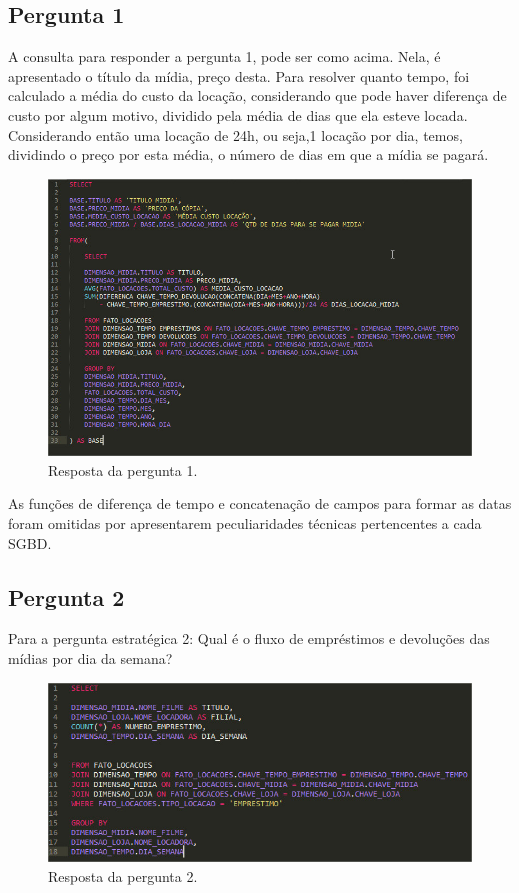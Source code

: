 \subsection{Pergunta 1}

A consulta para responder a pergunta 1, 
pode ser como acima. Nela, é apresentado o 
título da mídia, preço desta. Para resolver 
quanto tempo, foi calculado a média do custo da locação, 
considerando que pode haver diferença de custo por algum motivo, 
dividido pela média de dias que ela esteve locada. Considerando 
então uma locação de 24h, ou seja,1 locação por dia, temos, dividindo 
o preço por esta média, o número de dias em que a mídia se pagará.

\begin{figure}[!htb]
   \centering
   \caption{Resposta da pergunta 1.}\label{fig:fato} 
   \includegraphics[scale=0.4]{imagens/sql-1.jpeg}
\end{figure}

As funções de diferença de tempo e concatenação de 
campos para formar as datas foram omitidas por apresentarem 
peculiaridades técnicas pertencentes a cada SGBD.

\subsection{Pergunta 2}

Para a pergunta estratégica 2: Qual é o fluxo de empréstimos e devoluções das mídias por dia da semana?

\begin{figure}[!htb]
   \centering
   \caption{Resposta da pergunta 2.}\label{fig:fato} 
   \includegraphics[scale=0.5]{imagens/sql-0.jpeg}
\end{figure}

